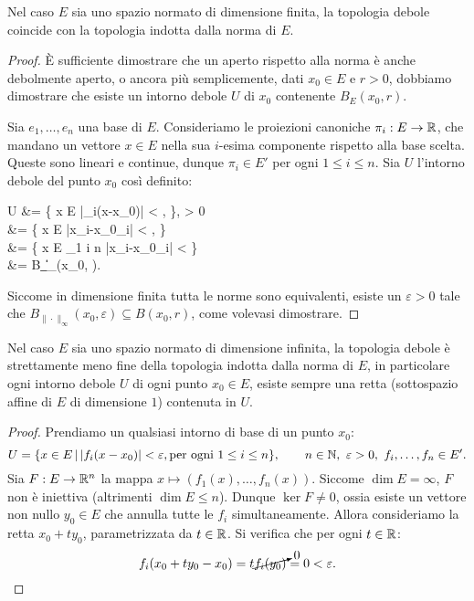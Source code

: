 \begin{theorem}
	Nel caso $E$ sia uno spazio normato di dimensione finita, la topologia debole coincide con la topologia indotta dalla norma di $E$.
\end{theorem}
\begin{proof}
	È sufficiente dimostrare che un aperto rispetto alla norma è anche debolmente aperto, o ancora più semplicemente, dati $x_0 \in E$ e $r > 0$, dobbiamo dimostrare che esiste un intorno debole $U$ di $x_0$ contenente $B_E(x_0, r)$.

	Sia $e_1, \ldots, e_n$ una base di $E$. Consideriamo le proiezioni canoniche $\pi_i : E \to \mathbb{R}$, che mandano un vettore $x \in E$ nella sua $i$-esima componente rispetto alla base scelta. Queste sono lineari e continue, dunque $\pi_i \in E'$ per ogni $1 \leq i \leq n$.
	Sia $U$ l'intorno debole del punto $x_0$ così definito:
	\begin{eqalign*}
		U &= \{ x \in E \suchthat |\pi_i(x-x_0)| < \varepsilon,  \}, \qquad \varepsilon > 0\\
		&= \{ x \in E \suchthat |x_i-{x_0}_i| < \varepsilon,  \}\\
		&= \{ x \in E \suchthat \max_{1 \leq i \leq n} |x_i-{x_0}_i| < \varepsilon \}\\
		&= B_{\|\cdot\|_\infty}(x_0, \varepsilon).
	\end{eqalign*}
	Siccome in dimensione finita tutta le norme sono equivalenti, esiste un $\varepsilon > 0$ tale che $B_{\|\cdot\|_\infty}(x_0, \varepsilon) \subseteq B(x_0, r)$, come volevasi dimostrare.
\end{proof}
\begin{theorem}
	Nel caso $E$ sia uno spazio normato di dimensione infinita, la topologia debole è strettamente meno fine della topologia indotta dalla norma di $E$, in particolare ogni intorno debole $U$ di ogni punto $x_0 \in E$, esiste sempre una retta (sottospazio affine di $E$ di dimensione $1$) contenuta in $U$.
\end{theorem}
\begin{proof}
	Prendiamo un qualsiasi intorno di base di un punto $x_0$:
	\begin{equation*}
		U = \{ x \in E \suchthat |f_i(x-x_0)| < \varepsilon, \text{per ogni $1 \leq i \leq n$} \}, \qquad n \in \N,\ \varepsilon > 0,\ f_i, \ldots, f_n \in E'.
	\end{equation*}
	Sia $F: E \to \mathbb{R}^n$ la mappa $x \mapsto (f_1(x), \ldots, f_n(x))$. Siccome $\dim E = \infty$, $F$ non è iniettiva (altrimenti $\dim E \leq n$). Dunque $\ker F \neq 0$, ossia esiste un vettore non nullo $y_0 \in E$ che annulla tutte le $f_i$ simultaneamente. Allora consideriamo la retta $x_0 + t y_0$, parametrizzata da $t \in \mathbb{R}$. Si verifica che per ogni $t \in \mathbb{R}$:
	\begin{equation*}
		f_i(x_0+ty_0 - x_0) = t \cancelto{0}{f_i(y_0)}=0 < \varepsilon.
	\end{equation*}
\end{proof}

